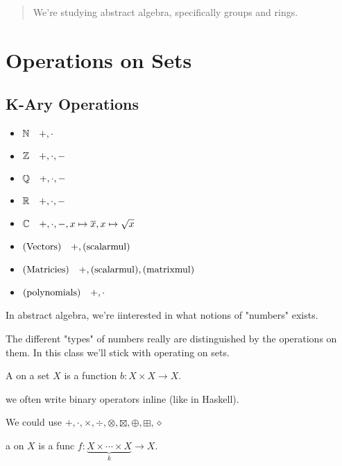 \documentclass[12pt]{article}
\begin{document}
\maketitle 

\begin{abstract}
  We're studying abstract algebra, specifically groups and rings.
\end{abstract}

\tableofcontents

\pagebreak

\section{Operations on Sets}
\subsection{K-Ary Operations}

\begin{itemize}
  \item \(\mathbb N\quad +,\cdot\)
  \item \(\mathbb Z\quad +,\cdot,-\)
  \item \(\mathbb Q\quad +,\cdot,-\)
  \item \(\mathbb R\quad +,\cdot,-\)
  \item \(\mathbb C\quad +,\cdot,-,x\mapsto\overline x,x\mapsto\sqrt x\)
  \item \((\mathrm{Vectors})\quad +,(\mathrm{scalar mul})\)
  \item \((\mathrm{Matricies})\quad +,(\mathrm{scalar mul}),(\mathrm{matrix mul})\)
  \item \((\mathrm{polynomials})\quad +,\cdot\)
\end{itemize}

In abstract algebra, we're iinterested in what notions of "numbers" exists.

The different "types" of numbers really are distinguished by the operations on
them. In this class we'll stick with operating on sets.

\bbox
\begin{defn}
  A  on a set \(X\) is a function \(b:X\times X\to X\).
\end{defn}
\ebox
\bboxnote
{} we often write binary operators inline (like in Haskell).
\ebox

We could use \(+,\cdot,\times,\div,\otimes,\boxtimes,\oplus,\boxplus,\diamond\)


\bbox
\begin{defn}
  a  on \(X\) is a func \(f:\underset k{\underbrace{
  X\times\cdots\times X}}\to X\).
\end{defn}
\ebox
\end{document}
